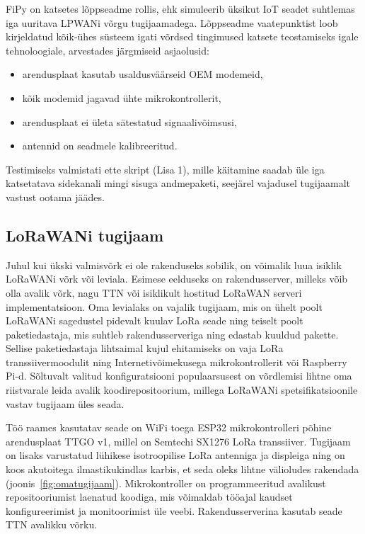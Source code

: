 \documentclass[12pt]{article}
\begin{document}
    FiPy on katsetes lõppseadme rollis, ehk simuleerib üksikut IoT seadet suhtlemas iga uuritava LPWANi võrgu tugijaamadega.
    Lõppseadme vaatepunktist loob kirjeldatud kõik-ühes süsteem igati võrdsed tingimused katsete teostamiseks igale tehnoloogiale, arvestades järgmiseid asjaolusid:
    \begin{itemize}
        \item arendusplaat kasutab usaldusväärseid OEM modemeid,
        \item kõik modemid jagavad ühte mikrokontrollerit,
        \item arendusplaat ei ületa sätestatud signaalivõimsusi,
        \item antennid on seadmele kalibreeritud.
    \end{itemize}
    Testimiseks valmistati ette skript (Lisa 1), mille käitamine saadab üle iga katsetatava sidekanali mingi sisuga andmepaketi, seejärel vajadusel tugijaamalt vastust ootama jäädes.


    \subsection{LoRaWANi tugijaam}

    Juhul kui ükski valmisvõrk ei ole rakenduseks sobilik, on võimalik luua isiklik LoRaWANi võrk või leviala.
    Esimese eelduseks on rakendusserver, milleks võib olla avalik võrk, nagu TTN või isiklikult hostitud LoRaWAN serveri implementatsioon.
    Oma levialaks on vajalik tugijaam, mis on ühelt poolt LoRaWANi sagedustel pidevalt kuulav LoRa seade ning teiselt poolt paketiedastaja, mis suhtleb rakendusserveriga ning edastab kuuldud pakette.
    Sellise paketiedastaja lihtsaimal kujul ehitamiseks on vaja LoRa transsiivermoodulit ning Internetivõimekusega mikrokontrollerit või Raspberry Pi-d.
    Sõltuvalt valitud konfiguratsiooni populaarsusest on võrdlemisi lihtne oma riistvarale leida avalik koodirepositoorium, millega LoRaWANi spetsifikatsioonile vastav tugijaam üles seada.

    Töö raames kasutatav seade on WiFi toega ESP32 mikrokontrolleri põhine arendusplaat TTGO v1, millel on Semtechi SX1276 LoRa transsiiver.
    Tugijaam on lisaks varustatud lühikese isotroopilise LoRa antenniga ja displeiga ning on koos akutoitega ilmastikukindlas karbis, et seda oleks lihtne välioludes rakendada (joonis~\ref{fig:omatugijaam}).
    Mikrokontroller on programmeeritud avalikust repositooriumist laenatud koodiga, mis võimaldab tööajal kaudset konfigureerimist ja monitoorimist üle veebi.
    Rakendusserverina kasutab seade TTN avalikku võrku.
\end{document}
